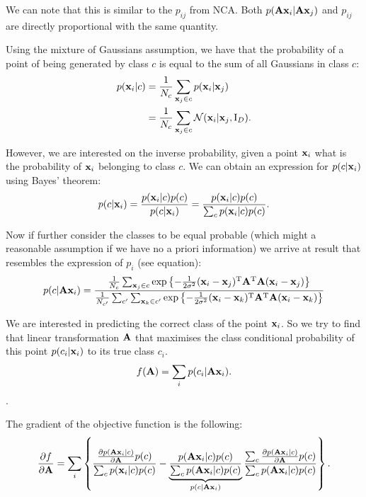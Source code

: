 We can note that this is similar to the $p_{ij}$ from NCA. Both $p(\mathbf{A}\mathbf{x}_i|\mathbf{A}\mathbf{x}_j)$ and $p_{ij}$ are directly proportional with the same quantity.

Using the mixture of Gaussians assumption, we have that the probability of a point of being generated by class $c$ is equal to the sum of all Gaussians in class $c$:
\begin{align}
	p(\mathbf{x}_i|c) &= \frac{1}{N_c}\sum_{\mathbf{x}_j \in c} p(\mathbf{x}_i|\mathbf{x}_j)\\
			   &= \frac{1}{N_c}\sum_{\mathbf{x}_j \in c} \mathcal{N}(\mathbf{x}_i|\mathbf{x}_j, \mathrm{I}_D).
\end{align}

However, we are interested on the inverse probability, given a point $\mathbf{x}_i$ what is the probability of $\mathbf{x}_i$ belonging to class $c$. We can obtain an expression for $p(c|\mathbf{x}_i)$ using Bayes' theorem:
\begin{align}
	p(c|\mathbf{x}_i) = \frac{p(\mathbf{x}_i|c)p(c)}{p(c|\mathbf{x}_i)} = \frac{p(\mathbf{x}_i|c)p(c)}{\sum_{c} p(\mathbf{x}_i|c)p(c)}.
	\label{eq:nca-cc-kde-bayes}
\end{align}

Now if further consider the classes to be equal probable (which might a reasonable assumption if we have no a priori information) we arrive at result that resembles the expression of $p_i$ (see equation):
\begin{align}
	p(c|\mathbf{A}\mathbf{x}_i) = \frac{
				\frac{1}{N_c}\sum_{\mathbf{x}_j \in c}\exp\left\{-\frac{1}{2\sigma^2}(\mathbf{x}_i - \mathbf{x}_j)^\mathrm{T}\mathbf{A}^\mathrm{T}\mathbf{A}(\mathbf{x}_i - \mathbf{x}_j)\right\}
				}
				{
				\frac{1}{N_{c'}}\sum_{c'} \sum_{\mathbf{x}_k \in c'}\exp\left\{-\frac{1}{2\sigma^2}(\mathbf{x}_i - \mathbf{x}_k)^\mathrm{T}\mathbf{A}^\mathrm{T}\mathbf{A}(\mathbf{x}_i - \mathbf{x}_k)\right\} 
				}
\end{align}

We are interested in predicting the correct class of the point $\mathbf{x}_i$. So we try to find that linear transformation $\mathbf{A}$ that maximises the class conditional probability of this point $p(c_i|\mathbf{x}_i)$ to its true class $c_i$. 
\begin{align}
	f(\mathbf{A}) = \sum_i p(c_i|\mathbf{A}\mathbf{x}_i).
	\label{eq:nca-cc-kde-obj}
\end{align}.

The gradient of the objective function is the following:
\begin{align}
	\frac{\partial f}{\partial \mathbf{A}} = 
	  \sum_i \left\{ 
	  			\frac
	  			{
	  				\frac{\partial p(\mathbf{A}\mathbf{x}_i|c)}{\partial \mathbf{A}}p(c)
	  			}
	  			{
	  				\sum_c p(\mathbf{x}_i|c)p(c)
	  			}
	  			- \underbrace{\frac{
	  				p(\mathbf{A}\mathbf{x}_i|c)p(c)
	  			}{
	  				\sum_c p(\mathbf{A}\mathbf{x}_i|c)p(c)		
	  			}}_{p(c|\mathbf{A}\mathbf{x}_i)}
	  			\frac{
	  				\sum_c \frac{\partial p(\mathbf{A}\mathbf{x}_i|c)}{\partial \mathbf{A}}p(c)
	  			}{
	  				\sum_c p(\mathbf{A}\mathbf{x}_i|c)p(c)
	  			}
	  	     \right \}.
	\label{eq:nca-cc-kde-grad}
\end{align}